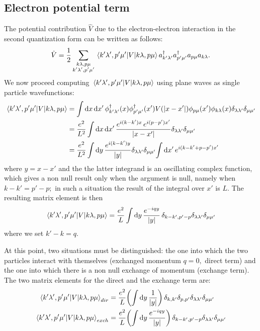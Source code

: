 \documentclass[a4paper]{article}
\begin{document}
\subsection*{Electron potential term}
\noindent The potential contribution $\hat{V}$ due to the electron-electron interaction in the second quantization form can be written as follows:
\begin{equation}
\hat{V} = \frac{1}{2} \sum_{\substack{k\lambda,p\mu\\k'\lambda',p'\mu'}}\mel{k'\lambda',p'\mu'}{V}{k\lambda,p\mu} a^\dag_{k'\lambda'}a^\dag_{p'\mu'}a_{p\mu}a_{k\lambda}.
\end{equation}
We now proceed computing $\mel{k'\lambda',p'\mu'}{V}{k\lambda,p\mu}$ using plane waves as single particle wavefunctions:
\begin{align}
\mel{k'\lambda',p'\mu'}{V}{k\lambda,p\mu} &= \int \dd{x}\dd{x'} \phi^\dag_{k'\lambda'}(x) \phi^\dag_{p'\mu'}(x')V(\abs{x-x'}) \phi_{p\mu}(x')\phi_{k\lambda}(x)\delta_{\lambda\lambda'}\delta_{\mu\mu'}\\
&= \frac{e^2}{L^2}\int \dd{x}\dd{x'}\frac{e^{i(k-k')x}\,e^{i(p-p')x'}}{\abs{x-x'}}\delta_{\lambda\lambda'}\delta_{\mu\mu'}\\
&=\frac{e^2}{L^2} \int \dd{y} \frac{e^{i(k-k')y}}{\abs{y}} \delta_{\lambda\lambda'}\delta_{\mu\mu'}{\int\dd{x'} e^{i(k-k'+p-p')x'}} 
\end{align}
where $y=x-x'$ and the the latter integrand is an oscillating complex function, which gives a non null result only when the argument is null, namely when $k-k' = p'-p;$ in such a situation the result of the integral over $x'$ is $L.$
The resulting matrix element is then
\begin{equation}
\mel{k'\lambda',p'\mu'}{V}{k\lambda,p\mu} =\frac{e^2}{L} \int \dd{y} \frac{e^{-iqy}}{\abs{y}} \,\delta_{k-k',p'-p}\delta_{\lambda\lambda'}\delta_{\mu\mu'}
\end{equation}
where we set $k'-k = q.$

\noindent At this point, two situations must be distinguished: the one into which the two particles interact with themselves (exchanged momentum $q=0,$ direct term) and the one into which there is a non null exchange of momentum (exchange term).
The two matrix elements for the direct and the exchange term are:
\begin{align}
\mel{k'\lambda',p'\mu'}{V}{k\lambda,p\mu}_{dir} &=\frac{e^2}{L} \pqty{\int \dd{y} \frac{1}{\abs{y}}} \,\delta_{k,k'}\delta_{p,p'}\delta_{\lambda\lambda'}\delta_{\mu\mu'}\\
\mel{k'\lambda',p'\mu'}{V}{k\lambda,p\mu}_{exch} &=\frac{e^2}{L} \pqty{\int \dd{y} \frac{e^{-iqy}}{\abs{y}}} \,\delta_{k-k',p'-p}\delta_{\lambda\lambda'}\delta_{\mu\mu'}
\end{align}
\end{document}
